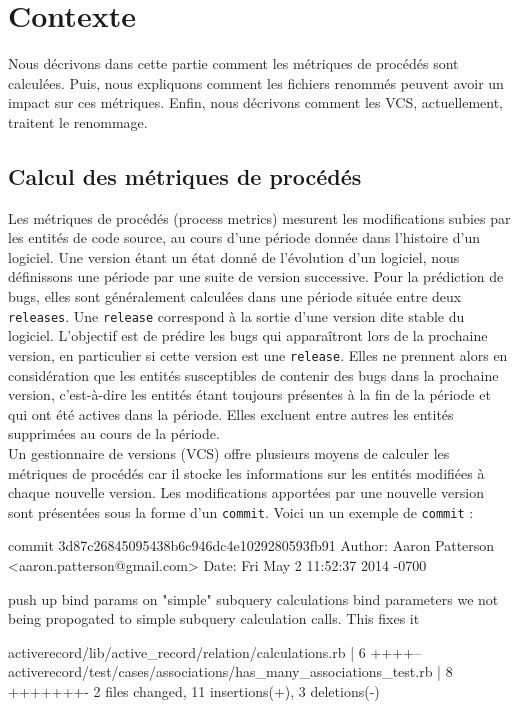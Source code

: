 \section{Contexte}
\label{sec:metriques}

Nous décrivons dans cette partie comment les métriques de procédés sont calculées. Puis, nous expliquons comment les fichiers renommés peuvent avoir un impact sur ces métriques. Enfin, nous décrivons comment les VCS, actuellement, traitent le renommage.

\subsection{Calcul des métriques de procédés}

Les métriques de procédés (process metrics) mesurent les modifications subies par les entités de code source, au cours d'une période donnée dans l'histoire d'un logiciel. Une version étant un état donné de l'évolution d'un logiciel, nous définissons une période par une suite de version successive. Pour la prédiction de bugs, elles sont généralement calculées dans une période située entre deux \texttt{releases}. Une \texttt{release} correspond à la sortie d'une version dite stable du logiciel. L'objectif est de prédire les bugs qui apparaîtront lors de la prochaine version, en particulier si cette version est une \texttt{release}. Elles ne prennent alors en considération que les entités susceptibles de contenir des bugs dans la prochaine version, c'est-à-dire les entités étant toujours présentes à la fin de la période et qui ont été actives dans la période. Elles excluent entre autres les entités supprimées au cours de la période.\\

Un gestionnaire de versions (VCS) offre plusieurs moyens de calculer les métriques de procédés car il stocke les informations sur les entités modifiées à chaque nouvelle version. Les modifications apportées par une nouvelle version sont présentées sous la forme d'un \texttt{commit}. Voici un un exemple de \texttt{commit} :\\

\begingroup
	\fontsize{8pt}{12pt}\selectfont
	\centering\begin{boxedverbatim}
	commit 3d87c26845095438b6c946dc4e1029280593fb91	
	Author: Aaron Patterson <aaron.patterson@gmail.com>
	Date:   Fri May 2 11:52:37 2014 -0700

	    push up bind params on "simple" subquery calculations 
	    bind parameters we not being propogated to simple subquery 
	    calculation calls. This fixes it

	 activerecord/lib/active_record/relation/calculations.rb            |    6 ++++--
	 activerecord/test/cases/associations/has_many_associations_test.rb |    8 +++++++-
	 2 files changed, 11 insertions(+), 3 deletions(-)
	\end{boxedverbatim}
\endgroup
\linebreak

